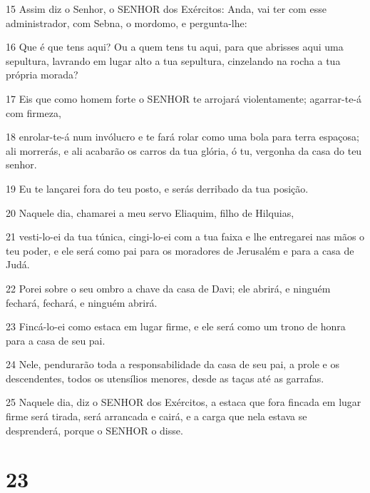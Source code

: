 \par 15 Assim diz o Senhor, o SENHOR dos Exércitos: Anda, vai ter com esse administrador, com Sebna, o mordomo, e pergunta-lhe:
\par 16 Que é que tens aqui? Ou a quem tens tu aqui, para que abrisses aqui uma sepultura, lavrando em lugar alto a tua sepultura, cinzelando na rocha a tua própria morada?
\par 17 Eis que como homem forte o SENHOR te arrojará violentamente; agarrar-te-á com firmeza,
\par 18 enrolar-te-á num invólucro e te fará rolar como uma bola para terra espaçosa; ali morrerás, e ali acabarão os carros da tua glória, ó tu, vergonha da casa do teu senhor.
\par 19 Eu te lançarei fora do teu posto, e serás derribado da tua posição.
\par 20 Naquele dia, chamarei a meu servo Eliaquim, filho de Hilquias,
\par 21 vesti-lo-ei da tua túnica, cingi-lo-ei com a tua faixa e lhe entregarei nas mãos o teu poder, e ele será como pai para os moradores de Jerusalém e para a casa de Judá.
\par 22 Porei sobre o seu ombro a chave da casa de Davi; ele abrirá, e ninguém fechará, fechará, e ninguém abrirá.
\par 23 Fincá-lo-ei como estaca em lugar firme, e ele será como um trono de honra para a casa de seu pai.
\par 24 Nele, pendurarão toda a responsabilidade da casa de seu pai, a prole e os descendentes, todos os utensílios menores, desde as taças até as garrafas.
\par 25 Naquele dia, diz o SENHOR dos Exércitos, a estaca que fora fincada em lugar firme será tirada, será arrancada e cairá, e a carga que nela estava se desprenderá, porque o SENHOR o disse.

\chapter{23}

